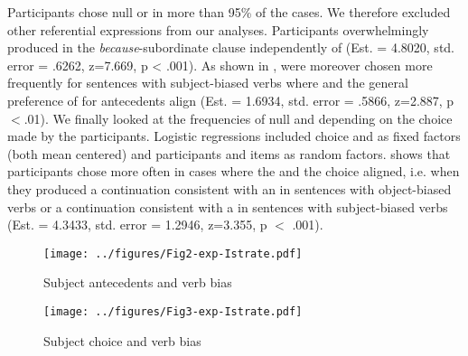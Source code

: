 \documentclass[output=paper,colorlinks,citecolor=brown]{langscibook}
\begin{document}
Participants chose null or  in more than 95\% of the cases. We therefore excluded other referential expressions from our analyses. Participants overwhelmingly produced  in the \textit{because}-subordinate clause independently of  (Est. = 4.8020, std. error = .6262, z=7.669, p < .001). As shown in ,  were moreover chosen more frequently for sentences with subject-biased verbs where  and the general preference of  for  antecedents align (Est. = 1.6934, std. error = .5866, z=2.887, p $<$.01). We finally looked at the frequencies of null and  depending on the  choice made by the participants. Logistic regressions included  choice and  as fixed factors (both mean centered) and participants and items as random factors.  shows that participants chose  more often in cases where the  and the  choice aligned, i.e. when they produced a continuation consistent with an   in sentences with object-biased verbs or a continuation consistent with a   in sentences with subject-biased verbs (Est. = 4.3433, std. error = 1.2946, z=3.355, p $<$ .001).

\begin{figure}[h]
\texttt{[image: ../figures/Fig2-exp-Istrate.pdf]}
\caption{Subject antecedents and verb bias}
\label{vbias_nullsubj:Istrate}
\end{figure}

\begin{figure}[h]
\texttt{[image: ../figures/Fig3-exp-Istrate.pdf]}
\caption{Subject choice and verb bias}
\label{vbias_antec:Istrate}
\end{figure}
\end{document}
